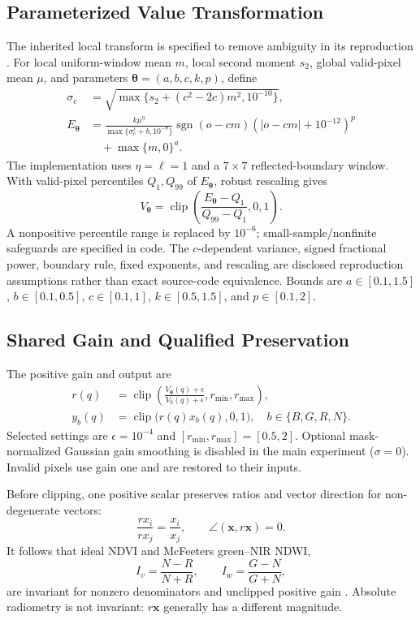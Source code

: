 \documentclass[conference]{IEEEtran}
\newcommand{\clip}{\operatorname{clip}}
\newcommand{\sgn}{\operatorname{sgn}}
\begin{document}
\subsection{Parameterized Value Transformation}
The inherited local transform is specified to remove ambiguity in its reproduction \cite{rentapalli2026}. For local uniform-window mean $m$, local second moment $s_2$, global valid-pixel mean $\mu$, and parameters $\boldsymbol{\theta}=(a,b,c,k,p)$, define
\begin{align}
\sigma_c&=\sqrt{\max\{s_2+(c^2-2c)m^2,10^{-10}\}},\\
E_{\boldsymbol{\theta}}&=
\frac{k\mu^{\eta}}{\max\{\sigma_c^{\ell}+b,10^{-8}\}}
\sgn(o-cm)(|o-cm|+10^{-12})^{p}\nonumber\\
&\quad+\max\{m,0\}^{a}.
\end{align}
The implementation uses $\eta=\ell=1$ and a $7\times7$ reflected-boundary window. With valid-pixel percentiles $Q_1,Q_{99}$ of $E_{\boldsymbol{\theta}}$, robust rescaling gives
\begin{equation}
V_{\boldsymbol{\theta}}=\clip\left(
\frac{E_{\boldsymbol{\theta}}-Q_1}{Q_{99}-Q_1},0,1\right).
\label{eq:transform}
\end{equation}
A nonpositive percentile range is replaced by $10^{-6}$; small-sample/nonfinite safeguards are specified in code. The $c$-dependent variance, signed fractional power, boundary rule, fixed exponents, and rescaling are disclosed reproduction assumptions rather than exact source-code equivalence. Bounds are $a\in[0.1,1.5]$, $b\in[0.1,0.5]$, $c\in[0.1,1]$, $k\in[0.5,1.5]$, and $p\in[0.1,2]$.

\subsection{Shared Gain and Qualified Preservation}
The positive gain and output are
\begin{align}
r(q)&=\clip\left(\frac{V_{\boldsymbol{\theta}}(q)+\epsilon}
{V_0(q)+\epsilon},r_{\min},r_{\max}\right),\label{eq:gain}\\
y_b(q)&=\clip\big(r(q)x_b(q),0,1\big),\quad b\in\{B,G,R,N\}.
\label{eq:output}
\end{align}
Selected settings are $\epsilon=10^{-4}$ and $[r_{\min},r_{\max}]=[0.5,2]$. Optional mask-normalized Gaussian gain smoothing is disabled in the main experiment ($\sigma=0$). Invalid pixels use gain one and are restored to their inputs.

Before clipping, one positive scalar preserves ratios and vector direction for non-degenerate vectors:
\begin{equation}
\frac{r x_i}{r x_j}=\frac{x_i}{x_j},\qquad
\angle(\mathbf{x},r\mathbf{x})=0.
\end{equation}
It follows that ideal NDVI and McFeeters green--NIR NDWI,
\begin{equation}
I_v=\frac{N-R}{N+R},\qquad I_w=\frac{G-N}{G+N},
\label{eq:indices}
\end{equation}
are invariant for nonzero denominators and unclipped positive gain \cite{rouse1974,mcfeeters1996}. Absolute radiometry is not invariant: $r\mathbf{x}$ generally has a different magnitude.
\end{document}
